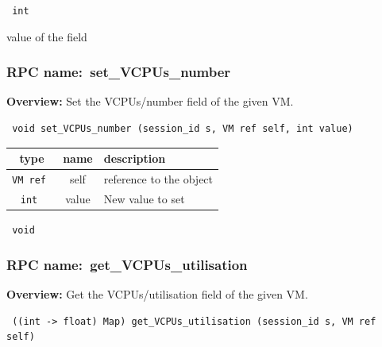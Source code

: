 \vspace{0.3cm}

{\tt 
int
}


value of the field
\vspace{0.3cm}
\vspace{0.3cm}
\vspace{0.3cm}
\subsubsection{RPC name:~set\_VCPUs\_number}

{\bf Overview:} 
Set the VCPUs/number field of the given VM.

\begin{verbatim} void set_VCPUs_number (session_id s, VM ref self, int value)\end{verbatim}



 
\vspace{0.3cm}
\begin{tabular}{|c|c|p{7cm}|}
 \hline
{\bf type} & {\bf name} & {\bf description} \\ \hline
{\tt VM ref } & self & reference to the object \\ \hline 

{\tt int } & value & New value to set \\ \hline 

\end{tabular}

\vspace{0.3cm}

{\tt 
void
}



\vspace{0.3cm}
\vspace{0.3cm}
\vspace{0.3cm}
\subsubsection{RPC name:~get\_VCPUs\_utilisation}

{\bf Overview:} 
Get the VCPUs/utilisation field of the given VM.

\begin{verbatim} ((int -> float) Map) get_VCPUs_utilisation (session_id s, VM ref self)\end{verbatim}


